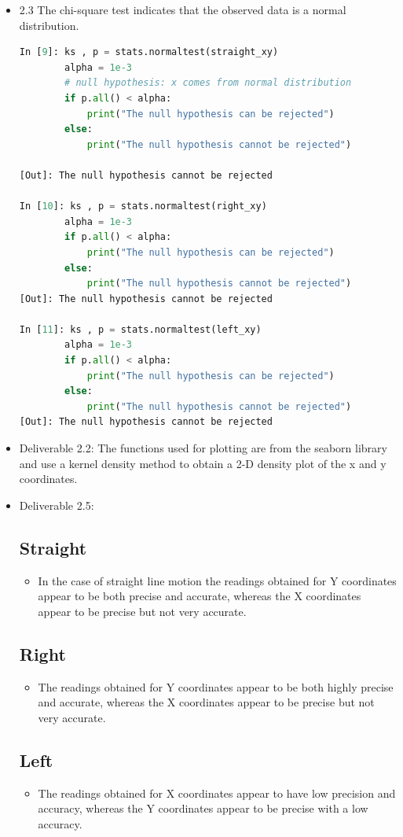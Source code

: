 \documentclass[11pt,a4paper]{article}
\begin{document}
\begin{itemize}
\item 2.3 The chi-square test indicates that the observed data is a normal distribution.
\begin{lstlisting}[language=Python]
In [9]: ks , p = stats.normaltest(straight_xy)
		alpha = 1e-3
        # null hypothesis: x comes from normal distribution
		if p.all() < alpha: 
			print("The null hypothesis can be rejected")
		else:
			print("The null hypothesis cannot be rejected")
            
[Out]: The null hypothesis cannot be rejected

In [10]: ks , p = stats.normaltest(right_xy)
		alpha = 1e-3
		if p.all() < alpha: 
			print("The null hypothesis can be rejected")
		else:
			print("The null hypothesis cannot be rejected")
[Out]: The null hypothesis cannot be rejected

In [11]: ks , p = stats.normaltest(left_xy)
		alpha = 1e-3
		if p.all() < alpha: 
			print("The null hypothesis can be rejected")
		else:
			print("The null hypothesis cannot be rejected")
[Out]: The null hypothesis cannot be rejected
\end{lstlisting}

\item Deliverable 2.2: The functions used for plotting are from the seaborn library and use a kernel density method to obtain a 2-D density plot of the x and y coordinates. 
\item Deliverable 2.5:
\subsection{Straight}
\begin{itemize}
\item In the case of straight line motion the readings obtained for Y coordinates appear to be both precise and accurate, whereas the X coordinates appear to be precise but not very accurate.
\end{itemize} 
\subsection{Right}
\begin{itemize}
\item The readings obtained for Y coordinates appear to be both highly precise and accurate, whereas the X coordinates appear to be precise but not very accurate.
\end{itemize}
\subsection{Left}
\begin{itemize}
\item The readings obtained for X coordinates appear to have low precision and accuracy, whereas the Y coordinates appear to be precise with a low accuracy.
\end{itemize}
\end{itemize}
\end{document}
